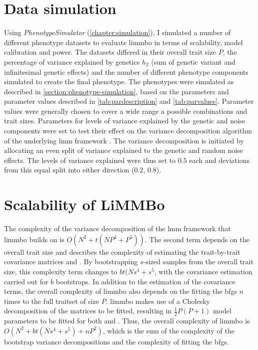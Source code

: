 \section{Data simulation}
\label{section:data-limmbo}
Using \textit{PhenotypeSimulator} (\cref{chapter:simulation}), I simulated a number of different phenotype datasets to evaluate \gls{limmbo} in terms of scalability, model calibration and power. The datasets differed in their overall trait size \(P\), the percentage of variance explained by genetics \(h_2\) (sum of genetic variant and infinitesimal genetic effects) and the number of different phenotype components simulated to create the final phenotype. The phenotypes were simulated as described in \cref{section:phenotype-simulation}, based on the parameters and parameter values described in \cref{tab:pardescription} and \cref{tab:parvalues}. Parameter values were generally chosen to cover a wide range a possible combinations and trait sizes. Parameters for levels of variance explained by the genetic and noise components were set to test their effect on the variance decomposition algorithm of the underlying \gls{lmm} framework \citep{Casale2015}. The variance decomposition is initiated by allocating an even split of variance explained to the genetic and random noise effects. The levels of variance explained were thus set to \(0.5\) each and deviations from this equal split into either direction (\(0.2\), \(0.8\)). 
%

\section{Scalability of LiMMBo}
\label{section:scalability-limmbo}
The complexity of the variance decomposition of the \gls{lmm} framework that \gls{limmbo} builds on is \(O(N^2 + t(NP^4 + P^5))\). The second term depends on the overall trait size and describes the complexity of estimating the trait-by-trait covariance matrices   and  . By bootstrapping \(s\)-sized samples from the overall trait size, this complexity term changes to \(bt(Ns^4 + s^5\), with the covariance estimation carried out for \(b\) bootstraps. In addition to the estimation of the covariance terms, the overall complexity of \gls{limmbo} also depends on the fitting the \gls{bfgs} \(n\) times to the full traitset of size \(P\). \gls{limmbo} makes use of a Cholesky decomposition of the matrices to be fitted, resulting in $\frac{1}{2}P(P+1)$ model parameters to be fitted for both   and  . Thus, the overall complexity of \gls{limmbo} is \(O(N^2 + bt(Ns^4 + s^5) + nP^2)\), which is the sum of the complexity of the bootstrap variance decompositions and the complexity of fitting the \gls{bfgs}.  

